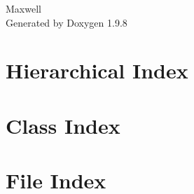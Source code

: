 \documentclass[twoside]{book}
\newcommand{\+}{\discretionary{\mbox{\scriptsize$\hookleftarrow$}}{}{}}
\newcommand{\clearemptydoublepage}{%
    \newpage{\pagestyle{empty}\cleardoublepage}%
  }
\begin{document}
  \raggedbottom
    \hypersetup{pageanchor=false,
                bookmarksnumbered=true,
                pdfencoding=unicode
               }
  \begin{titlepage}
  \vspace*{7cm}
  \begin{center}%
  {\Large Maxwell}\\
  \vspace*{1cm}
  {\large Generated by Doxygen 1.9.8}\\
  \end{center}
  \end{titlepage}
  \clearemptydoublepage
  \tableofcontents
  \clearemptydoublepage
  \hypersetup{pageanchor=true}
\chapter{Hierarchical Index}

\chapter{Class Index}

\chapter{File Index}

\end{document}
